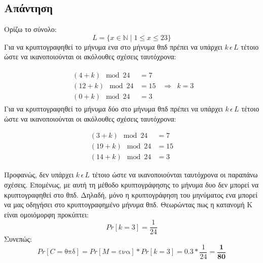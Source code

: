 \documentclass[12pt]{article}
\begin{document}
\subsection*{Απάντηση}
Ορίζω το σύνολο:
\begin{equation*}
L = \{ x \in \mathbb{N} \mid 1 \leq x \leq 23 \}
\end{equation*}
\newline
Για να κρυπτογραφηθεί το μήνυμα ενα στο μήνυμα θπδ πρέπει να υπάρχει \( k \, \epsilon \, L \) τέτοιο ώστε να ικανοποιούνται οι ακόλουθες σχέσεις ταυτόχρονα:

\begin{equation*}
\begin{array}{ccc}
\begin{aligned}
(4 + k) \mod 24 &= 7 \\
(12 + k) \mod 24 &= 15 \\
(0 + k) \mod 24 &= 3
\end{aligned}
& \Rightarrow &
k = 3
\end{array}
\end{equation*}
Για να κρυπτογραφηθεί το μήνυμα δύο στο μήνυμα θπδ πρέπει να υπάρχει \( k \, \epsilon \, L \) τέτοιο ώστε να ικανοποιούνται οι ακόλουθες σχέσεις ταυτόχρονα:

\begin{equation*} \label{eq:2}
\begin{aligned}
(3 + k) \mod 24 &= 7 \\
(19 + k) \mod 24 &= 15 \\
(14 + k) \mod 24 &= 3
\end{aligned}
\end{equation*}

Προφανώς, δεν υπάρχει $ k \, \epsilon \, L $ τέτοιο ώστε να ικανοποιούνται ταυτόχρονα οι παραπάνω σχέσεις. Επομένως, με αυτή τη μέθοδο κρυπτογράφησης το μήνυμα δυο δεν μπορεί να κρυπτογραφηθεί στο θπδ. Δηλαδή, μόνο η κρυπτογράφηση του μηνύματος ενα μπορεί να μας οδηγήσει στο κρυπτογραφημένο μήνυμα θπδ.
\newline
\newline
Θεωρώντας πως η κατανομή Κ είναι ομοιόμορφη προκύπτει:
\[
Pr[k = 3] = \frac{1}{24}
\]
Συνεπώς:
\[
Pr[C = \text{θπδ}] = Pr[M = \text{ενα}] * Pr[k = 3] = 0.3 * \frac{1}{24} = \mathbf{\frac{1}{80}}
\]
\hfill \blacksquare
\end{document}
